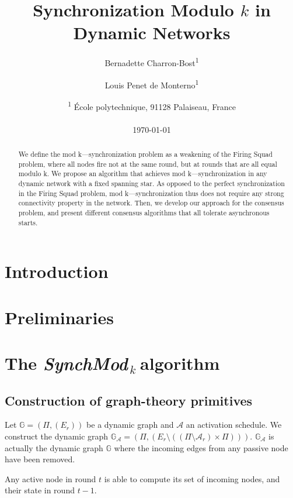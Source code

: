 \documentclass[11pt,letterpaper]{article}
\title{Synchronization Modulo $k$ in Dynamic Networks}
\author{Bernadette Charron-Bost\textsuperscript{1} \and Louis Penet de Monterno\textsuperscript{1}}
\date{\textsuperscript{1} \'Ecole polytechnique, 91128 Palaiseau, France\\~\\ \today}
\newcommand{\SM}{{\em SynchMod}$_{\,k}\ $}
\begin{document}
\maketitle
\tableofcontents

\begin{abstract}
	We define the mod k—synchronization problem as a weakening of the Firing Squad problem,
	where all nodes fire not at the same round, but at rounds that are all equal modulo k.
	We propose an algorithm that achieves mod k—synchronization  in any dynamic network
	with a fixed spanning star. As opposed to the perfect synchronization in
	the Firing Squad problem, mod k—synchronization thus does not require
	any strong connectivity property in the network. 
	Then, we develop our approach for the consensus problem,
	and present different consensus algorithms that all tolerate asynchronous starts.
\end{abstract}

\section{Introduction}

\section{Preliminaries}\label{sec:model}

\section{The \SM algorithm}

\subsection{Construction of graph-theory primitives}

Let $\mathds{G} = (\Pi, (E_r))$ be a dynamic graph and $\mathcal{A}$ an activation schedule.
We construct the dynamic graph $\mathds{G}_\mathcal{A} = (\Pi, (E_r \setminus ((\Pi \setminus \mathcal{A}_r) \times \Pi)))$.
$\mathds{G}_\mathcal{A}$ is actually the dynamic graph $\mathds{G}$ where the incoming edges from any passive node have been removed.

Any active node in round $t$ is able to compute its set of incoming nodes, and their state in round $t-1$.
\end{document}
